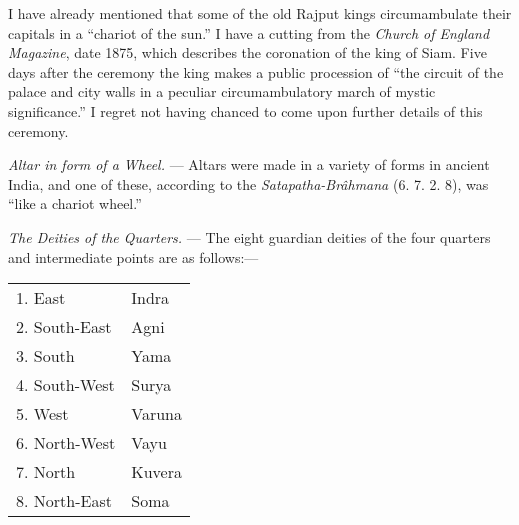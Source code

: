 \documentclass[a4paper, 11pt, oneside, polutonikogreek, english]{article}
\begin{document}
I have already mentioned that some of the old Rajput kings circumambulate their capitals in a ``chariot of the sun.'' I have a cutting from the \emph{Church of England Magazine}, date 1875, which describes the coronation of the king of Siam. Five days after the ceremony the king makes a public procession of ``the circuit of the palace and city walls in a peculiar circumambulatory march of mystic significance.'' I regret not having chanced to come upon further details of this ceremony.

\emph{Altar in form of a Wheel.} --- Altars were made in a variety of forms in ancient India, and one of these, according to the \emph{Satapatha-Brâhmana} (6. 7. 2. 8), was ``like a chariot wheel.''

\emph{The Deities of the Quarters.} --- The eight guardian deities of the four quarters and intermediate points are as follows:---

\begin{table}[H]
    \centering\small
    \begin{tabular}{l l}
        1. East & Indra \\
        2. South-East & Agni \\
        3. South & Yama \\
        4. South-West & Surya \\
        5. West & Varuna \\
        6. North-West & Vayu \\
        7. North & Kuvera \\
        8. North-East & Soma \\
    \end{tabular}
\end{table}
\end{document}

